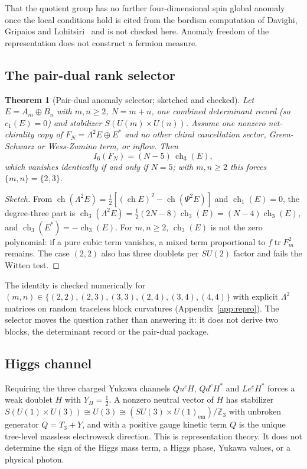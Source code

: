 \documentclass[11pt]{article}
\newtheorem{theorem}{Theorem}[section]
\theoremstyle{definition}
\theoremstyle{remark}
\newcommand{\Z}{\mathbb{Z}}
\newcommand{\ch}{\operatorname{ch}}
\begin{document}
That the quotient group has no further four-dimensional spin global anomaly once the
local conditions hold is cited from the bordism computation of Davighi, Gripaios and
Lohitsiri~\cite{davighi2020} and is not checked here. Anomaly freedom of the
representation does not construct a fermion measure.

\subsection{The pair-dual rank selector}

\begin{theorem}[Pair-dual anomaly selector; sketched and checked]
\label{thm:pairdual}
Let $E=A_m\oplus B_n$ with $m,n\ge2$, $N=m+n$, one combined determinant record (so
$c_1(E)=0$) and stabilizer $S(U(m)\times U(n))$. Assume one nonzero net-chirality copy
of $F_N=\Lambda^2E\oplus E^*$ and no other chiral cancellation sector, Green-Schwarz or
Wess-Zumino term, or inflow. Then
\begin{equation}
I_6(F_N)=(N-5)\,\ch_3(E),
\end{equation}
which vanishes identically if and only if $N=5$; with $m,n\ge2$ this forces
$\{m,n\}=\{2,3\}$.
\end{theorem}

\begin{proof}[Sketch]
From $\ch(\Lambda^2E)=\frac12[(\ch E)^2-\ch(\Psi^2E)]$ and $\ch_1(E)=0$, the degree-three
part is $\ch_3(\Lambda^2E)=\frac12(2N-8)\ch_3(E)=(N-4)\ch_3(E)$, and
$\ch_3(E^*)=-\ch_3(E)$. For $m,n\ge2$, $\ch_3(E)$ is not the zero polynomial: if a pure
cubic term vanishes, a mixed term proportional to $f\operatorname{tr}F_m^2$ remains. The
case $(2,2)$ also has three doublets per $SU(2)$ factor and fails the Witten test.
\end{proof}

The identity is checked numerically for $(m,n)\in\{(2,2),(2,3),(3,3),(2,4),(3,4),(4,4)\}$
with explicit $\Lambda^2$ matrices on random traceless block curvatures
(Appendix~\ref{app:repro}). The selector moves the question rather than answering it:
it does not derive two blocks, the determinant record or the pair-dual package.

\subsection{Higgs channel}

Requiring the three charged Yukawa channels $Qu^cH$, $Qd^cH^*$ and $Le^cH^*$ forces a
weak doublet $H$ with $Y_H=\tfrac12$. A nonzero neutral vector of $H$ has stabilizer
$S(U(1)\times U(3))\cong U(3)\cong(SU(3)\times U(1)_{\mathrm{em}})/\Z_3$ with unbroken
generator $Q=T_3+Y$, and with a positive gauge kinetic term $Q$ is the unique tree-level
massless electroweak direction. This is representation theory. It does not determine
the sign of the Higgs mass term, a Higgs phase, Yukawa values, or a physical photon.
\end{document}
